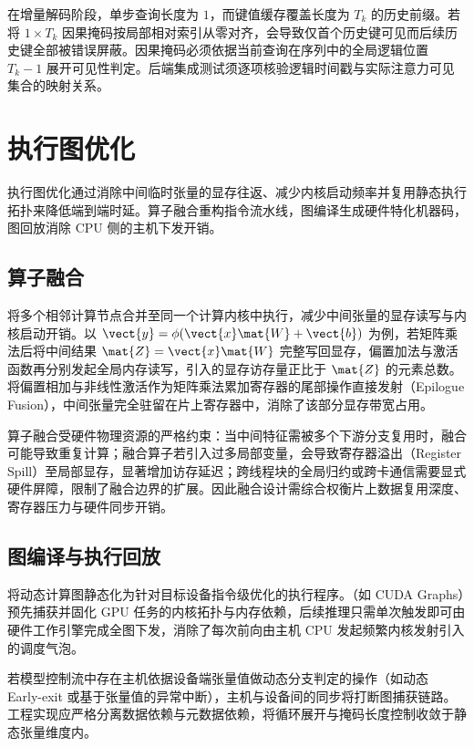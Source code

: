 \documentclass[../textbook.tex]{subfiles}
\begin{document}
在增量解码阶段，单步查询长度为 $1$，而键值缓存覆盖长度为 $T_k$ 的历史前缀。若将 $1\times T_k$ 因果掩码按局部相对索引从零对齐，会导致仅首个历史键可见而后续历史键全部被错误屏蔽。因果掩码必须依据当前查询在序列中的全局逻辑位置 $T_k-1$ 展开可见性判定。后端集成测试须逐项核验逻辑时间戳与实际注意力可见集合的映射关系。

\section{执行图优化}

执行图优化通过消除中间临时张量的显存往返、减少内核启动频率并复用静态执行拓扑来降低端到端时延。算子融合重构指令流水线，图编译生成硬件特化机器码，图回放消除 CPU 侧的主机下发开销。

\subsection{算子融合}

将多个相邻计算节点合并至同一个计算内核中执行，减少中间张量的显存读写与内核启动开销。以 $\vect{y}=\phi(\vect{x}\mat{W}+\vect{b})$ 为例，若矩阵乘法后将中间结果 $\mat{Z}=\vect{x}\mat{W}$ 完整写回显存，偏置加法与激活函数再分别发起全局内存读写，引入的显存访存量正比于 $\mat{Z}$ 的元素总数。将偏置相加与非线性激活作为矩阵乘法累加寄存器的尾部操作直接发射（Epilogue Fusion），中间张量完全驻留在片上寄存器中，消除了该部分显存带宽占用。

算子融合受硬件物理资源的严格约束：当中间特征需被多个下游分支复用时，融合可能导致重复计算；融合算子若引入过多局部变量，会导致寄存器溢出（Register Spill）至局部显存，显著增加访存延迟；跨线程块的全局归约或跨卡通信需要显式硬件屏障，限制了融合边界的扩展。因此融合设计需综合权衡片上数据复用深度、寄存器压力与硬件同步开销。

\subsection{图编译与执行回放}

将动态计算图静态化为针对目标设备指令级优化的执行程序。（如 CUDA Graphs）预先捕获并固化 GPU 任务的内核拓扑与内存依赖，后续推理只需单次触发即可由硬件工作引擎完成全图下发，消除了每次前向由主机 CPU 发起频繁内核发射引入的调度气泡。

若模型控制流中存在主机依据设备端张量值做动态分支判定的操作（如动态 Early-exit 或基于张量值的异常中断），主机与设备间的同步将打断图捕获链路。工程实现应严格分离数据依赖与元数据依赖，将循环展开与掩码长度控制收敛于静态张量维度内。
\end{document}

